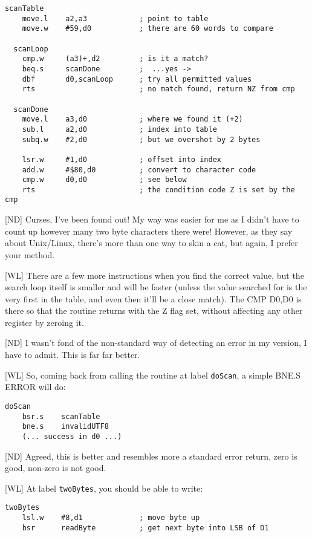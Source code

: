 \begin{lstlisting}[numbers=none]	
  scanTable
    move.l    a2,a3            ; point to table
    move.w    #59,d0           ; there are 60 words to compare

  scanLoop
    cmp.w     (a3)+,d2         ; is it a match?
    beq.s     scanDone         ;  ...yes ->
    dbf       d0,scanLoop      ; try all permitted values
    rts                        ; no match found, return NZ from cmp

  scanDone   
    move.l    a3,d0            ; where we found it (+2)
    sub.l     a2,d0            ; index into table
    subq.w    #2,d0            ; but we overshot by 2 bytes

    lsr.w     #1,d0            ; offset into index
    add.w     #$80,d0          ; convert to character code
    cmp.w     d0,d0            ; see below
    rts                        ; the condition code Z is set by the cmp
\end{lstlisting}

[ND] Curses, I've been found out! My way was easier for me as I didn't have to count up however many two byte characters there were! However, as they say about Unix/Linux, there's more than one way to skin a cat, but again, I prefer your method.
	
[WL] There are a few more instructions when you find the correct value, but the search loop itself is smaller and will be faster (unless the value searched for is the very first in the table, and even then it'll be a close match). The CMP D0,D0 is there so that the routine returns with the Z flag set, without affecting any other register by zeroing it. 

[ND] I wasn't fond of the non-standard way of detecting an error in my version, I have to admit. This is far far better.

[WL] So, coming back from calling the routine at label \texttt{doScan}, a simple BNE.S ERROR will do:
	
\begin{lstlisting}[numbers=none]	
  doScan   
    bsr.s    scanTable
    bne.s    invalidUTF8
    (... success in d0 ...)
\end{lstlisting}

[ND] Agreed, this is better and resembles more a standard error return, zero is good, non-zero is not good.

[WL] At label \texttt{twoBytes}, you should be able to write:

\begin{lstlisting}[numbers=none]
  twoBytes
    lsl.w    #8,d1             ; move byte up
    bsr      readByte          ; get next byte into LSB of D1
\end{lstlisting}
	
